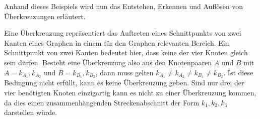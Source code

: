 Anhand dieses Beispiels wird nun das Entstehen, Erkennen und Auflösen von Überkreuzungen erläutert.

Eine Überkreuzung repräsentiert das Auftreten eines Schnittpunkts von zwei Kanten eines Graphen in einem für den Graphen relevanten Bereich.
Ein Schnittpunkt von zwei Kanten bedeutet hier, dass keine der vier Knoten gleich sein dürfen.
Besteht eine Überkreuzung also aus den Knotenpaaren $A$ und $B$ mit $A=k_{A_1},k_{A_2}$ und $B=k_{B_1},k_{B_2}$, dann muss gelten $k_{A_1} \neq k_{A_2} \neq k_{B_1} \neq k_{B_2}$.
Ist diese Bedingung nicht erfüllt, kann es keine Überkreuzung geben.
Sind nur drei der vier benötigten Knoten einzigartig kann es nicht zu einer Überkreuzung kommen, da dies einen zusammenhängenden Streckenabschnitt der Form $k_1, k_2, k_3$ darstellen würde.

